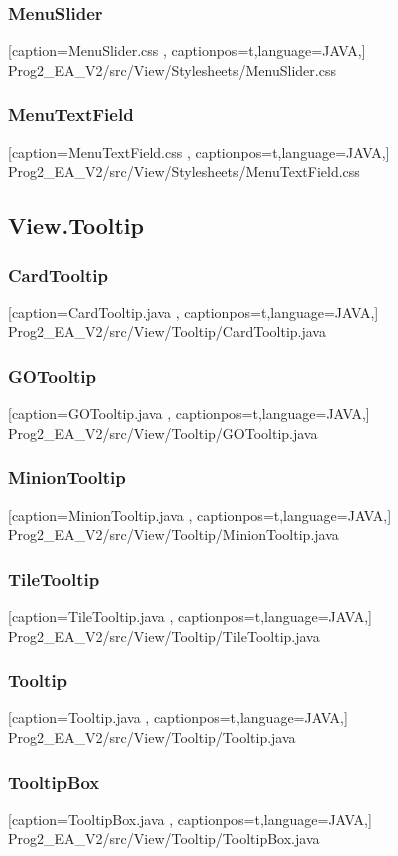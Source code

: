 \documentclass[a4paper,12pt]{scrartcl}
\begin{document}
	\subsubsection{MenuSlider}
	
	[caption={MenuSlider.css}
	\label{lst:javaclass},
	captionpos=t,language=JAVA,]
	{Prog2_EA_V2/src/View/Stylesheets/MenuSlider.css}
	\subsubsection{MenuTextField}
	
	[caption={MenuTextField.css}
	\label{lst:javaclass},
	captionpos=t,language=JAVA,]
	{Prog2_EA_V2/src/View/Stylesheets/MenuTextField.css}
	\subsection{View.Tooltip}
	\subsubsection{CardTooltip}
	
	[caption={CardTooltip.java}
	\label{lst:javaclass},
	captionpos=t,language=JAVA,]
	{Prog2_EA_V2/src/View/Tooltip/CardTooltip.java}
	\subsubsection{GOTooltip}
	
	[caption={GOTooltip.java}
	\label{lst:javaclass},
	captionpos=t,language=JAVA,]
	{Prog2_EA_V2/src/View/Tooltip/GOTooltip.java}
	\subsubsection{MinionTooltip}
	
	[caption={MinionTooltip.java}
	\label{lst:javaclass},
	captionpos=t,language=JAVA,]
	{Prog2_EA_V2/src/View/Tooltip/MinionTooltip.java}
	\subsubsection{TileTooltip}
	
	[caption={TileTooltip.java}
	\label{lst:javaclass},
	captionpos=t,language=JAVA,]
	{Prog2_EA_V2/src/View/Tooltip/TileTooltip.java}
	\subsubsection{Tooltip}
	
	[caption={Tooltip.java}
	\label{lst:javaclass},
	captionpos=t,language=JAVA,]
	{Prog2_EA_V2/src/View/Tooltip/Tooltip.java}
	\subsubsection{TooltipBox}
	
	[caption={TooltipBox.java}
	\label{lst:javaclass},
	captionpos=t,language=JAVA,]
	{Prog2_EA_V2/src/View/Tooltip/TooltipBox.java}
\end{document}
